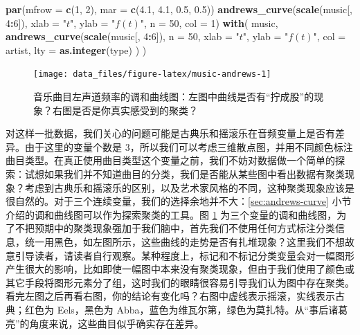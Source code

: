 \documentclass[
  b5paper,
  UTF8,twoside]{book}
\newenvironment{Shaded}{\begin{snugshade}}{\end{snugshade}}
\newcommand{\AttributeTok}[1]{\textcolor[rgb]{0.13,0.29,0.53}{#1}}
\newcommand{\DecValTok}[1]{\textcolor[rgb]{0.00,0.00,0.81}{#1}}
\newcommand{\FloatTok}[1]{\textcolor[rgb]{0.00,0.00,0.81}{#1}}
\newcommand{\FunctionTok}[1]{\textcolor[rgb]{0.13,0.29,0.53}{\textbf{#1}}}
\newcommand{\NormalTok}[1]{#1}
\newcommand{\SpecialCharTok}[1]{\textcolor[rgb]{0.81,0.36,0.00}{\textbf{#1}}}
\newcommand{\StringTok}[1]{\textcolor[rgb]{0.31,0.60,0.02}{#1}}
\begin{document}
\begin{Shaded}
\begin{Highlighting}[]
\FunctionTok{par}\NormalTok{(}\AttributeTok{mfrow =} \FunctionTok{c}\NormalTok{(}\DecValTok{1}\NormalTok{, }\DecValTok{2}\NormalTok{), }\AttributeTok{mar =} \FunctionTok{c}\NormalTok{(}\FloatTok{4.1}\NormalTok{, }\FloatTok{4.1}\NormalTok{, }\FloatTok{0.5}\NormalTok{, }\FloatTok{0.5}\NormalTok{))}
\FunctionTok{andrews\_curve}\NormalTok{(}\FunctionTok{scale}\NormalTok{(music[, }\DecValTok{4}\SpecialCharTok{:}\DecValTok{6}\NormalTok{]), }\AttributeTok{xlab =} \StringTok{"$t$"}\NormalTok{, }\AttributeTok{ylab =} \StringTok{"$f(t)$"}\NormalTok{,}
              \AttributeTok{n =} \DecValTok{50}\NormalTok{, }\AttributeTok{col =} \DecValTok{1}\NormalTok{)}
\FunctionTok{with}\NormalTok{(}
\NormalTok{  music,}
  \FunctionTok{andrews\_curve}\NormalTok{(}\FunctionTok{scale}\NormalTok{(music[, }\DecValTok{4}\SpecialCharTok{:}\DecValTok{6}\NormalTok{]),}
    \AttributeTok{n =} \DecValTok{50}\NormalTok{, }\AttributeTok{xlab =} \StringTok{"$t$"}\NormalTok{, }\AttributeTok{ylab =} \StringTok{"$f(t)$"}\NormalTok{,}
    \AttributeTok{col =}\NormalTok{ artist, }\AttributeTok{lty =} \FunctionTok{as.integer}\NormalTok{(type)}
\NormalTok{  )}
\NormalTok{)}
\end{Highlighting}
\end{Shaded}

\begin{figure}

{\centering \texttt{[image: data\_files/figure-latex/music-andrews-1]} 

}

\caption[音乐曲目左声道频率的调和曲线图]{音乐曲目左声道频率的调和曲线图：左图中曲线是否有``拧成股''的现象？右图是否是你真实感受到的聚类？}\label{fig:music-andrews}
\end{figure}



对这样一批数据，我们关心的问题可能是古典乐和摇滚乐在音频变量上是否有差异。由于这里的变量个数是 3，所以我们可以考虑三维散点图，并用不同颜色标注曲目类型。在真正使用曲目类型这个变量之前，我们不妨对数据做一个简单的探索：试想如果我们并不知道曲目的分类，我们是否能从某些图中看出数据有聚类现象？考虑到古典乐和摇滚乐的区别，以及艺术家风格的不同，这种聚类现象应该是很自然的。对于三个连续变量，我们的选择余地并不大：\ref{sec:andrews-curve} 小节介绍的调和曲线图可以作为探索聚类的工具。图 \ref{fig:music-andrews} 为三个变量的调和曲线图，为了不把预期中的聚类现象强加于我们脑中，首先我们不使用任何方式标注分类信息，统一用黑色，如左图所示，这些曲线的走势是否有扎堆现象？这里我们不想故意引导读者，请读者自行观察。某种程度上，标记和不标记分类变量会对一幅图形产生很大的影响，比如即使一幅图中本来没有聚类现象，但由于我们使用了颜色或其它手段将图形元素分了组，这时我们的眼睛很容易引导我们认为图中存在聚类。看完左图之后再看右图，你的结论有变化吗？右图中虚线表示摇滚，实线表示古典；红色为 Eels，黑色为 Abba，蓝色为维瓦尔第，绿色为莫扎特。从``事后诸葛亮''的角度来说，这些曲目似乎确实存在差异。
\end{document}
